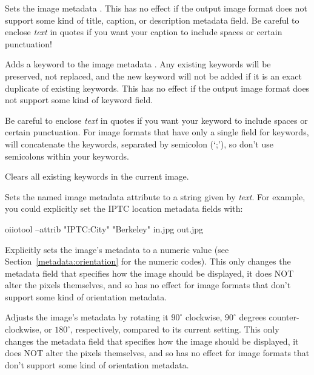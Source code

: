 Sets the image metadata .
This has no effect if the output image format does not support some kind
of title, caption, or description metadata field.
Be careful to enclose \emph{text} in quotes if you want your caption to
include spaces or certain punctuation!
\apiend

Adds a keyword to the image metadata .  Any existing
keywords will be preserved, not replaced, and the new keyword will not
be added if it is an exact duplicate of existing keywords.  This has no
effect if the output image format does not support some kind of keyword
field.  

Be careful to enclose \emph{text} in quotes if you want your keyword to
include spaces or certain punctuation.  For image formats that have only
a single field for keywords, \OpenImageIO will concatenate the keywords,
separated by semicolon (`;'), so don't use semicolons within your
keywords.
\apiend

Clears all existing keywords in the current image.
\apiend

Sets the named image metadata attribute to a string given by
\emph{text}.  For example, you could explicitly set the IPTC location
metadata fields with:

\begin{code}
        oiiotool --attrib "IPTC:City" "Berkeley" in.jpg out.jpg
\end{code}
\apiend

Explicitly sets the image's  metadata to a numeric
value (see Section~\ref{metadata:orientation} for the numeric codes).
This only changes the metadata field that specifies
how the image should be displayed, it does NOT alter the pixels
themselves, and so has no effect for image formats that don't
support some kind of orientation metadata.
\apiend

Adjusts the image's  metadata by rotating it $90^\circ$
clockwise, $90^\circ$ degrees counter-clockwise, or $180^\circ$,
respectively, compared to its current setting.  This only changes the
metadata field that specifies how the image should be displayed, it does
NOT alter the pixels themselves, and so has no effect for image formats
that don't support some kind of orientation metadata.
\apiend

